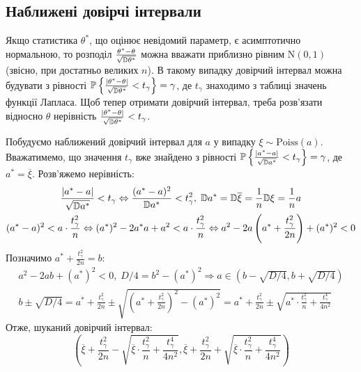 \subsection{Наближені довірчі інтервали}
Якщо статистика $\theta^*$, що оцінює невідомий параметр, є асимптотично нормальною, то розподіл 
$\frac{\theta^* - \theta}{\sqrt{\mathbb{D}\theta^*}}$ можна вважати приблизно рівним $\mathrm{N}(0, 1)$ (звісно, при достатньо великих $n$).
В такому випадку довірчий інтервал можна будувати з рівності
$\mathbb{P}\left\{\frac{|\theta^* - \theta|}{\sqrt{\mathbb{D}\theta^*}} < t_{\gamma}\right\} = \gamma$, де $t_{\gamma}$
знаходимо з таблиці значень функції Лапласа. Щоб тепер отримати довірчий інтервал, треба розв'язати відносно
$\theta$ нерівність $\frac{|\theta^* - \theta|}{\sqrt{\mathbb{D}\theta^*}} < t_{\gamma}$.
\begin{example}
    Побудуємо наближений довірчий інтервал для $a$ у випадку $\xi \sim \mathrm{Poiss}(a)$. Вважатимемо, що значення $t_\gamma$
    вже знайдено з рівності 
    $\mathbb{P}\left\{\frac{|a^* - a|}{\sqrt{\mathbb{D} a^*}} < t_{\gamma}\right\} = \gamma$, де $a^* = \overline{\xi}$. Розв'яжемо нерівність:
    \begin{gather*}
        \frac{|a^* - a|}{\sqrt{\mathbb{D} a^*}} < t_{\gamma} \Leftrightarrow
        \frac{(a^* - a)^2}{\mathbb{D} a^*} < t_{\gamma}^2, \; \mathbb{D} a^* = \mathbb{D} \overline{\xi} = \frac{1}{n}\mathbb{D}\xi = \frac{1}{n}{a} \\
        (a^* - a)^2 < a \cdot \frac{t_{\gamma}^2}{n} \Leftrightarrow (a^*)^2 - 2a^* a + a^2 < a \cdot \frac{t_{\gamma}^2}{n}
        \Leftrightarrow a^2 - 2a \left( a^* + \frac{t_{\gamma}^2}{2n}\right) + (a^*)^2 < 0
    \end{gather*}
    Позначимо $a^* + \frac{t_{\gamma}^2}{2n} = b$:
    \begin{gather*}
        a^2 - 2ab + (a^*)^2 < 0, \; D/4 = b^2 - (a^*)^2 \Rightarrow
        a \in \left(b - \sqrt{D/4}, b + \sqrt{D/4} \right) \\
        b \pm \sqrt{D/4} =  a^* + \frac{t_{\gamma}^2}{2n} \pm 
        \sqrt{\left( a^* + \frac{t_{\gamma}^2}{2n}\right)^2  - (a^*)^2} = 
        a^* + \frac{t_{\gamma}^2}{2n} \pm 
        \sqrt{a^* \cdot\frac{t_{\gamma}^2}{n} + \frac{t_{\gamma}^4}{4n^2}}
    \end{gather*}
    Отже, шуканий довірчий інтервал:
    $$ 
    \left(\overline{\xi} + \frac{t_{\gamma}^2}{2n} -
    \sqrt{\overline{\xi} \cdot\frac{t_{\gamma}^2}{n} + \frac{t_{\gamma}^4}{4n^2}},
    \overline{\xi} + \frac{t_{\gamma}^2}{2n} +
    \sqrt{\overline{\xi} \cdot\frac{t_{\gamma}^2}{n} + \frac{t_{\gamma}^4}{4n^2}}
    \right)
    $$
\end{example}

